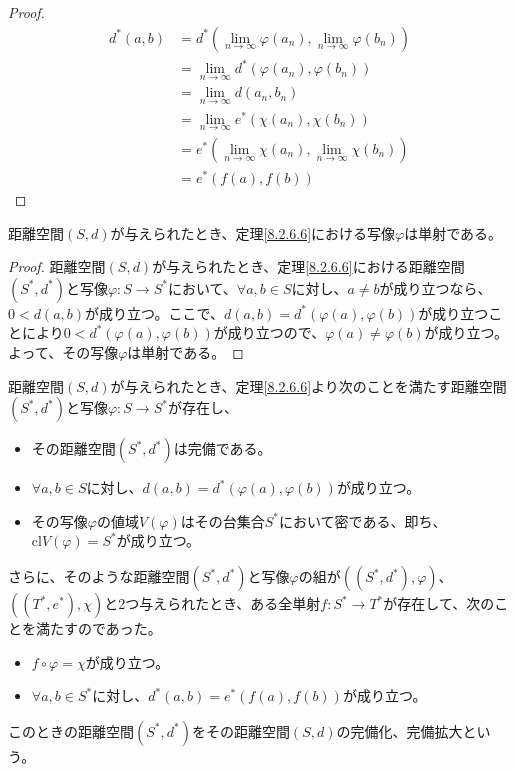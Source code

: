 \documentclass[dvipdfmx]{jsarticle}
\begin{document}
\begin{proof}
\begin{align*}
d^{*}(a,b) &= d^{*}\left( \lim_{n \rightarrow \infty}{\varphi\left( a_{n} \right)},\lim_{n \rightarrow \infty}{\varphi\left( b_{n} \right)} \right)\\
&= \lim_{n \rightarrow \infty}{d^{*}\left( \varphi\left( a_{n} \right),\varphi\left( b_{n} \right) \right)}\\
&= \lim_{n \rightarrow \infty}{d\left( a_{n},b_{n} \right)}\\
&= \lim_{n \rightarrow \infty}{e^{*}\left( \chi\left( a_{n} \right),\chi\left( b_{n} \right) \right)}\\
&= e^{*}\left( \lim_{n \rightarrow \infty}{\chi\left( a_{n} \right)},\lim_{n \rightarrow \infty}{\chi\left( b_{n} \right)} \right)\\
&= e^{*}\left( f(a),f(b) \right)
\end{align*}
\end{proof}
\begin{thm}\label{8.2.6.7} 距離空間$(S,d)$が与えられたとき、定理\ref{8.2.6.6}における写像$\varphi$は単射である。
\end{thm}
\begin{proof} 距離空間$(S,d)$が与えられたとき、定理\ref{8.2.6.6}における距離空間$\left( S^{*},d^{*} \right)$と写像$\varphi:S \rightarrow S^{*}$において、$\forall a,b \in S$に対し、$a \neq b$が成り立つなら、$0 < d(a,b)$が成り立つ。ここで、$d(a,b) = d^{*}\left( \varphi(a),\varphi(b) \right)$が成り立つことにより$0 < d^{*}\left( \varphi(a),\varphi(b) \right)$が成り立つので、$\varphi(a) \neq \varphi(b)$が成り立つ。よって、その写像$\varphi$は単射である。
\end{proof}
\begin{dfn}距離空間$(S,d)$が与えられたとき、定理\ref{8.2.6.6}より次のことを満たす距離空間$\left( S^{*},d^{*} \right)$と写像$\varphi:S \rightarrow S^{*}$が存在し、
\begin{itemize}
\item
  その距離空間$\left( S^{*},d^{*} \right)$は完備である。
\item
  $\forall a,b \in S$に対し、$d(a,b) = d^{*}\left( \varphi(a),\varphi(b) \right)$が成り立つ。
\item
  その写像$\varphi$の値域$V(\varphi)$はその台集合$S^{*}$において密である、即ち、${\mathrm{cl}}{V(\varphi)} = S^{*}$が成り立つ。
\end{itemize}
さらに、そのような距離空間$\left( S^{*},d^{*} \right)$と写像$\varphi$の組が$\left( \left( S^{*},d^{*} \right),\varphi \right)$、$\left( \left( T^{*},e^{*} \right),\chi \right)$と2つ与えられたとき、ある全単射$f:S^{*} \rightarrow T^{*}$が存在して、次のことを満たすのであった。
\begin{itemize}
\item
  $f \circ \varphi = \chi$が成り立つ。
\item
  $\forall a,b \in S^{*}$に対し、$d^{*}(a,b) = e^{*}\left( f(a),f(b) \right)$が成り立つ。
\end{itemize}
このときの距離空間$\left( S^{*},d^{*} \right)$をその距離空間$(S,d)$の完備化、完備拡大という。
\end{dfn}\par
\end{document}
